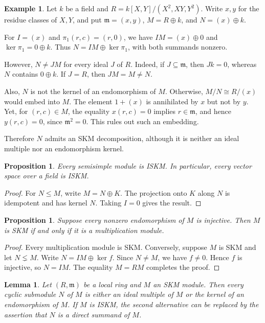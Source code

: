 \documentclass[11pt,a4paper]{article}
\newtheorem{proposition}[theorem]{Proposition}
\newtheorem{lemma}[theorem]{Lemma}
\theoremstyle{definition}
\newtheorem{example}[theorem]{Example}
\theoremstyle{remark}
\begin{document}
\begin{example} 
Let $k$ be a field and $R=k[X,Y]/(X^2,XY,Y^2)$. Write $x,y$ for the residue classes of $X,Y$, and put $\mathfrak m=(x,y)$, $M=R\oplus k$, and $N=(x)\oplus k$.

For $I=(x)$ and $\pi_1(r,c)=(r,0)$, we have $IM=(x)\oplus0$ and $\ker\pi_1=0\oplus k$. Thus $N=IM\oplus\ker\pi_1$, with both summands nonzero.

However, $N\ne JM$ for every ideal $J$ of $R$. Indeed, if $J\subseteq\mathfrak m$, then $Jk=0$, whereas $N$ contains $0\oplus k$. If $J=R$, then $JM=M\ne N$.

Also, $N$ is not the kernel of an endomorphism of $M$. Otherwise, $M/N\cong R/(x)$ would embed into $M$. The element $1+(x)$ is annihilated by $x$ but not by $y$. Yet, for $(r,c)\in M$, the equality $x(r,c)=0$ implies $r\in\mathfrak m$, and hence $y(r,c)=0$, since $\mathfrak m^2=0$. This rules out such an embedding.

Therefore $N$ admits an SKM decomposition, although it is neither an ideal multiple nor an endomorphism kernel.
\end{example}

\begin{proposition}
Every semisimple module is ISKM. In particular, every vector space over a field is ISKM.
\end{proposition}

\begin{proof}
For $N\leq M$, write $M=N\oplus K$. The projection onto $K$ along $N$ is idempotent and has kernel $N$. Taking $I=0$ gives the result.
\end{proof}

\begin{proposition}
Suppose every nonzero endomorphism of $M$ is injective. Then $M$ is SKM if and only if it is a multiplication module.
\end{proposition}

\begin{proof}
Every multiplication module is SKM. Conversely, suppose $M$ is SKM and let $N\lneq M$. Write $N=IM\oplus\ker f$. Since $N\ne M$, we have $f\ne0$. Hence $f$ is injective, so $N=IM$. The equality $M=RM$ completes the proof.
\end{proof}

\begin{lemma} 
Let $(R,\mathfrak m)$ be a local ring and $M$ an SKM module. Then every cyclic submodule $N$ of $M$ is either an ideal multiple of $M$ or the kernel of an endomorphism of $M$. If $M$ is ISKM, the second alternative can be replaced by the assertion that $N$ is a direct summand of $M$.
\end{lemma}
\end{document}
